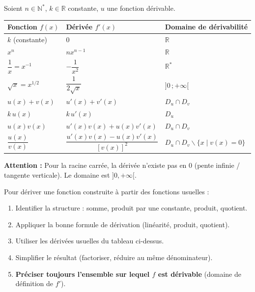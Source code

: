 \documentclass[11pt]{article}
\def\setminus{\mathbin{\backslash}}\let\smallsetminus\setminus
\begin{document}
\begin{propriete}
Soient $n \in \mathbb{N}^*$, $k \in \mathbb{R}$ constante, $u$ une fonction dérivable.
\begin{center}
\begin{tabularx}{\linewidth}{|l|X|X|}\hline
\textbf{Fonction $f(x)$} & \textbf{Dérivée $f'(x)$} & \textbf{Domaine de dérivabilité} \\ \hline
$k$ (constante) & $0$ & $\mathbb{R}$ \\ \hline
$x^n$ & $n x^{n-1}$ & $\mathbb{R}$ \\ \hline
$\dfrac{1}{x} = x^{-1}$ & $-\dfrac{1}{x^2}$ & $\mathbb{R}^*$ \\ \hline
$\sqrt{x} = x^{1/2}$ & $\dfrac{1}{2\sqrt{x}}$ & $]0\,;+\infty[$ \\ \hline
$u(x)+v(x)$ & $u'(x)+v'(x)$ & $D_u \cap D_v$ \\ \hline
$k\,u(x)$ & $k\,u'(x)$ & $D_u$ \\ \hline
$u(x)v(x)$ & $u'(x)v(x)+u(x)v'(x)$ & $D_u \cap D_v$ \\ \hline
$\dfrac{u(x)}{v(x)}$ & $\dfrac{u'(x)v(x)-u(x)v'(x)}{[v(x)]^2}$ & $D_u \cap D_v \setminus \{x \mid v(x)=0\}$ \\ \hline
\end{tabularx}
\end{center}
\textbf{Attention :} Pour la racine carrée, la dérivée n'existe pas en $0$ (pente infinie / tangente verticale). Le domaine est $]0,+\infty[$.
\end{propriete}

\begin{methode}
Pour dériver une fonction construite à partir des fonctions usuelles :
\begin{enumerate}
\item Identifier la structure : somme, produit par une constante, produit, quotient.
\item Appliquer la bonne formule de dérivation (linéarité, produit, quotient).
\item Utiliser les dérivées usuelles du tableau ci-dessus.
\item Simplifier le résultat (factoriser, réduire au même dénominateur).
\item \textbf{Préciser toujours l'ensemble sur lequel $f$ est dérivable} (domaine de définition de $f'$).
\end{enumerate}
\end{methode}
\end{document}
